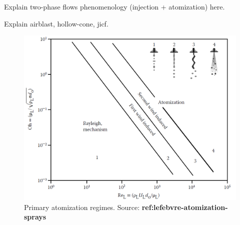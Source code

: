 Explain two-phase flows phenomenology (injection + atomization) here. 

Explain airblast, hollow-cone, jicf.

\begin{figure}[h!]
	\centering
	\includegraphics[scale=0.5]{./part0_intro/regimes_atomization_primary}
	\caption{Primary atomization regimes. Source: \textbf{ref:lefebvre-atomization-sprays}}
	\label{fig:regimes_atomization_primary}
\end{figure}

